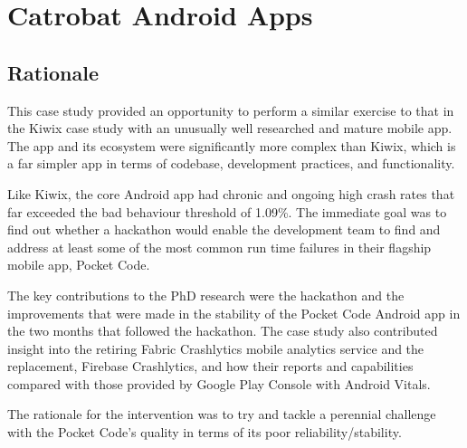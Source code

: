 \section{Catrobat Android Apps}
\label{section-catrobat-case-study}



\subsection*{Rationale}

This case study provided an opportunity to perform a similar exercise to that in the Kiwix case study with an unusually well researched and mature mobile app. The app and its ecosystem were significantly more complex than Kiwix, which is a far simpler app in terms of codebase, development practices, and functionality. 

Like Kiwix, the core Android app had chronic and ongoing high crash rates that far exceeded the bad behaviour threshold of 1.09\%. The immediate goal was to find out whether a hackathon would enable the development team to find and address at least some of the most common run time failures in their flagship mobile app, Pocket Code. 

The key contributions to the PhD research were the hackathon and the improvements that were made in the stability of the Pocket Code Android app in the two months that followed the hackathon. The case study also contributed insight into the retiring Fabric Crashlytics mobile analytics service and the replacement, Firebase Crashlytics, and how their reports and capabilities compared with those provided by Google Play Console with Android Vitals.

The rationale for the intervention was to try and tackle a perennial challenge with the Pocket Code's quality in terms of its poor reliability/stability.

